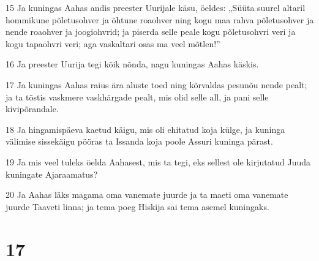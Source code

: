 \par 15 Ja kuningas Aahas andis preester Uurijale käsu, öeldes: „Süüta suurel altaril hommikune põletusohver ja õhtune roaohver ning kogu maa rahva põletusohver ja nende roaohver ja joogiohvrid; ja piserda selle peale kogu põletusohvri veri ja kogu tapaohvri veri; aga vaskaltari osas ma veel mõtlen!”
\par 16 Ja preester Uurija tegi kõik nõnda, nagu kuningas Aahas käskis.
\par 17 Ja kuningas Aahas raius ära aluste toed ning kõrvaldas pesunõu nende pealt; ja ta tõstis vaskmere vaskhärgade pealt, mis olid selle all, ja pani selle kivipõrandale.
\par 18 Ja hingamispäeva kaetud käigu, mis oli ehitatud koja külge, ja kuninga välimise sissekäigu pööras ta Issanda koja poole Assuri kuninga pärast.
\par 19 Ja mis veel tuleks öelda Aahasest, mis ta tegi, eks sellest ole kirjutatud Juuda kuningate Ajaraamatus?
\par 20 Ja Aahas läks magama oma vanemate juurde ja ta maeti oma vanemate juurde Taaveti linna; ja tema poeg Hiskija sai tema asemel kuningaks.

\chapter{17}


